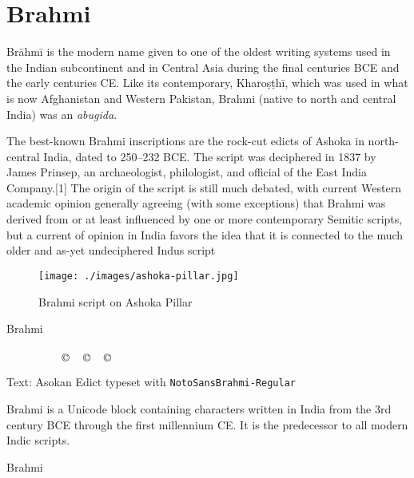 \section{Brahmi}
\label{s:brahmi}
Brāhmī is the modern name given to one of the oldest writing systems used in the Indian subcontinent and in Central Asia during the final centuries BCE and the early centuries CE. Like its contemporary, Kharoṣṭhī, which was used in what is now Afghanistan and Western Pakistan, Brahmi (native to north and central India) was an \emph{abugida}.

The best-known Brahmi inscriptions are the rock-cut edicts of Ashoka in north-central India, dated to 250–232 BCE. The script was deciphered in 1837 by James Prinsep, an archaeologist, philologist, and official of the East India Company.[1] The origin of the script is still much debated, with current Western academic opinion generally agreeing (with some exceptions) that Brahmi was derived from or at least influenced by one or more contemporary Semitic scripts, but a current of opinion in India favors the idea that it is connected to the much older and as-yet undeciphered Indus script

\begin{figure}[htb]
\centering
\texttt{[image: ./images/ashoka-pillar.jpg]}
\caption{Brahmi script on Ashoka Pillar}
\end{figure}



\begin{scriptexample}[]{Brahmi}
\bgroup
\raggedleft
\brahmi

         
   

\arial
\hfill Text: Asokan Edict typeset with \texttt{NotoSansBrahmi-Regular} 
\egroup
\end{scriptexample}

Brahmi is a Unicode block containing characters written in India from the 3rd century BCE through the first millennium CE. It is the predecessor to all modern Indic scripts.

\begin{scriptexample}[]{Brahmi}
\end{scriptexample}









